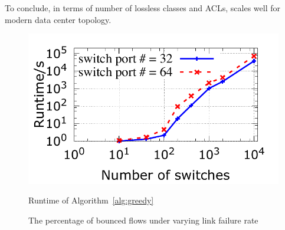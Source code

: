 To conclude, in terms of number of lossless classes and ACLs,
\sysname{} scales well for modern data center topology.

\begin{figure}[t!]
	\begin{minipage}{0.29\textwidth}
		\includegraphics[width=1\textwidth] {figs/algo_runtime}
		\caption{Runtime of Algorithm~\ref{alg:greedy} }
		\label{fig:algo_runtime}
	\end{minipage}
	\hfill
	\begin{minipage}{0.7\textwidth}
		\centering
		\caption{The percentage of bounced flows under varying link failure rate}
		\label{fig:bounce_probability}
	\end{minipage}
\end{figure}


